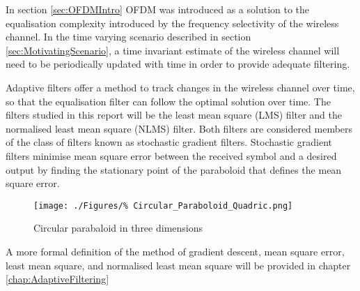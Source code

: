 In section \ref{sec:OFDMIntro} OFDM was introduced %
as a solution to the equalisation complexity introduced %
by the frequency selectivity of the wireless channel. In %
the time varying scenario described in section %
\ref{sec:MotivatingScenario}, a time invariant %
estimate of the wireless channel will need %
to be periodically updated with time in order %
to provide adequate filtering.

Adaptive filters offer a method to track changes in the %
wireless channel over time, so that the equalisation filter %
can follow the optimal solution over time. The filters %
studied in this report will be the least mean square (LMS) %
filter and the normalised least mean square (NLMS) filter. Both %
filters are considered members of the class of filters known %
as stochastic gradient filters. Stochastic gradient filters %
minimise mean square error between the received symbol %
and a desired output by finding the stationary point %
of the paraboloid that defines the mean square error.
\begin{figure}[ht]
	\centering
	\texttt{[image: ./Figures/\%
Circular\_Paraboloid\_Quadric.png]}
	\caption{Circular parabaloid in three dimensions 
	\cite{Paraboloid12}}
	\label{fig:Paraboloid}
\end{figure}
A more formal definition of the method of gradient descent, %
mean square error, least mean square, and normalised least mean %
square will be provided in chapter \ref{chap:AdaptiveFiltering}
